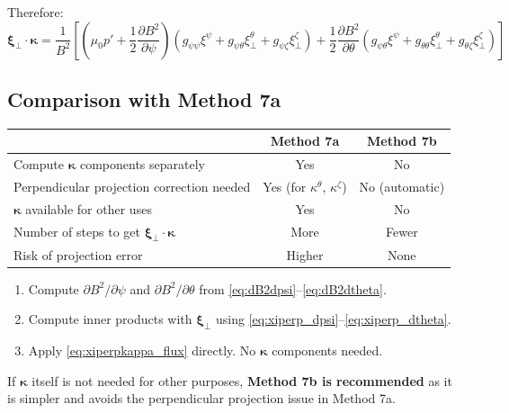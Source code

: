\documentclass[12pt,a4paper]{article}
\newcommand{\bxi}{\boldsymbol{\xi}}
\begin{document}
Therefore:
\begin{equation}
    \boxed{
    \bxi_\perp\cdot\bm{\kappa} = \frac{1}{B^2}\!\left[
    \left(\mu_0 p' + \frac{1}{2}\frac{\partial B^2}{\partial\psi}\right)
    \!\left(g_{\psi\psi}\xi^\psi + g_{\psi\theta}\xi^\theta_\perp + g_{\psi\zeta}\xi^\zeta_\perp\right)
    + \frac{1}{2}\frac{\partial B^2}{\partial\theta}
    \!\left(g_{\psi\theta}\xi^\psi + g_{\theta\theta}\xi^\theta_\perp + g_{\theta\zeta}\xi^\zeta_\perp\right)
    \right]
    }
    \label{eq:xiperpkappa_flux}
\end{equation}

\subsection{Comparison with Method 7a}

\begin{center}
\begin{tabular}{lcc}
\hline
 & \textbf{Method 7a} & \textbf{Method 7b} \\
\hline
Compute $\bm{\kappa}$ components separately & Yes & No \\
Perpendicular projection correction needed & Yes (for $\kappa^\theta$, $\kappa^\zeta$) & No (automatic) \\
$\bm{\kappa}$ available for other uses & Yes & No \\
Number of steps to get $\bxi_\perp\cdot\bm{\kappa}$ & More & Fewer \\
Risk of projection error & Higher & None \\
\hline
\end{tabular}
\end{center}

\begin{tcolorbox}[colback=red!3!white, colframe=red!40!black, title=\textbf{Summary: Computing $\bxi_\perp\cdot\bm{\kappa}$ directly (Method 7b)}]
\begin{enumerate}
    \item Compute $\partial B^2/\partial\psi$ and $\partial B^2/\partial\theta$ from \eqref{eq:dB2dpsi}--\eqref{eq:dB2dtheta}.
    \item Compute inner products with $\bxi_\perp$ using \eqref{eq:xiperp_dpsi}--\eqref{eq:xiperp_dtheta}.
    \item Apply \eqref{eq:xiperpkappa_flux} directly. No $\bm{\kappa}$ components needed.
\end{enumerate}
If $\bm{\kappa}$ itself is not needed for other purposes, \textbf{Method 7b is recommended} as it is simpler and avoids the perpendicular projection issue in Method 7a.
\end{tcolorbox}
\end{document}
